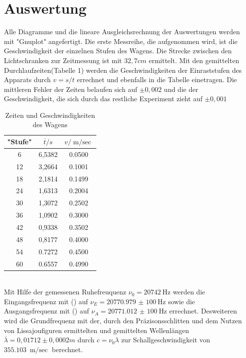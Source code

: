 

\section{Auswertung}

Alle Diagramme und die lineare Ausgleichsrechnung der Auswertungen werden mit "Gnuplot" angefertigt.
Die erste Messreihe, die aufgenommen wird, ist die Geschwindigkeit der einzelnen
Stufen des Wagens. Die Strecke zwischen den Lichtschranken zur Zeitmessung
ist mit $32,7 cm$ ermittelt. Mit den gemittelten Durchlaufzeiten(Tabelle 1) werden die
Geschwindigkeiten der Einraststufen des Apparats durch $ v = s/t $ errechnet und ebenfalls in die Tabelle einetragen.
Die mittleren Fehler der Zeiten belaufen sich auf $\pm{0,002}$ und die der Geschwindigkeit, die sich durch das restliche Experiment zieht auf $\pm{0,001}$
\\
\begin{table}
\centering
 \caption{Zeiten und Geschwindigkeiten des Wagens}
\label{tab:geschwin}
\begin{tabular}{ c c c }
\toprule
"Stufe" & $\overline{t}/s$ & $v/\si{\meter\per\sec}$ \\
\midrule
6 & 6,5382 & 0.0500 \\
12 & 3,2664 & 0.1001 \\
18 & 2,1814 & 0.1499\\
24 & 1,6313 & 0.2004\\
30 & 1,3072 & 0.2502\\
36 & 1,0902 & 0.3000\\
42 & 0,9338 & 0.3502\\
48 & 0,8177 & 0.4000\\
54 & 0.7272 & 0.4500\\
60 & 0.6557 & 0.4990\\
\bottomrule
\end{tabular}
\end{table}
\\
Mit Hilfe der gemessenen Ruhefreuquenz $\nu_0 = \SI{20742}{\hertz}$ werden die
Eingangsfrequenz mit () auf $\nu_E = \SI{20770,979(100)}{\hertz}$ sowie die Ausgangsfrequenz mit ()
auf $\nu_A = \SI{20771,012(100)}{\hertz}$ errechnet.
Desweiteren wird die Grundfrequenz mit der, durch den Präzisonsschlitten und dem
Nutzen von Lissajoufiguren ermittelten und gemittelten Wellenlängen
$\overline{\lambda} = 0,01712 \pm{0,0002} m $ durch $ c = \nu_0\lambda$ zur Schallgeschwindigkeit von $\SI{355,103}{\meter\per\sec}$
berechnet.
\\
